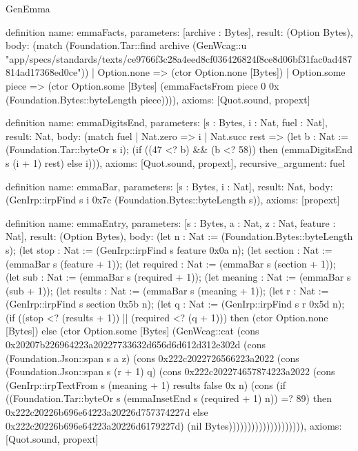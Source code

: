 \begin{lexlean}{GenEmma}
\begin{semanticmodule}
definition{
  name: emmaFacts,
  parameters: [archive : Bytes],
  result: (Option Bytes),
  body: (match (Foundation.Tar::find archive (GenWcag::u "app/specs/standards/texts/ce9766f3c28a4eed8cf036426824f8ce8d06bf31fac0ad487814ad17368ed0ce"))
    | Option.none => (ctor Option.none [Bytes])
    | Option.some piece => (ctor Option.some [Bytes] (emmaFactsFrom piece 0 0x (Foundation.Bytes::byteLength piece)))),
  axioms: [Quot.sound, propext]
}

definition{
  name: emmaDigitsEnd,
  parameters: [s : Bytes, i : Nat, fuel : Nat],
  result: Nat,
  body: (match fuel
    | Nat.zero => i
    | Nat.succ rest => (let b : Nat := (Foundation.Tar::byteOr s i); (if ((47 <? b) && (b <? 58)) then (emmaDigitsEnd s (i + 1) rest) else i))),
  axioms: [Quot.sound, propext],
  recursive_argument: fuel
}

definition{
  name: emmaBar,
  parameters: [s : Bytes, i : Nat],
  result: Nat,
  body: (GenIrp::irpFind s i 0x7c (Foundation.Bytes::byteLength s)),
  axioms: [propext]
}

definition{
  name: emmaEntry,
  parameters: [s : Bytes, a : Nat, z : Nat, feature : Nat],
  result: (Option Bytes),
  body: (let n : Nat := (Foundation.Bytes::byteLength s); (let stop : Nat := (GenIrp::irpFind s feature 0x0a n); (let section : Nat := (emmaBar s (feature + 1)); (let required : Nat := (emmaBar s (section + 1)); (let sub : Nat := (emmaBar s (required + 1)); (let meaning : Nat := (emmaBar s (sub + 1)); (let results : Nat := (emmaBar s (meaning + 1)); (let r : Nat := (GenIrp::irpFind s section 0x5b n); (let q : Nat := (GenIrp::irpFind s r 0x5d n); (if ((stop <? (results + 1)) || (required <? (q + 1))) then (ctor Option.none [Bytes]) else (ctor Option.some [Bytes] (GenWcag::cat (cons 0x20207b226964223a20227733632d656d6d612d312e302d (cons (Foundation.Json::span s a z) (cons 0x222c2022726566223a2022 (cons (Foundation.Json::span s (r + 1) q) (cons 0x222c202274657874223a2022 (cons (GenIrp::irpTextFrom s (meaning + 1) results false 0x n) (cons (if ((Foundation.Tar::byteOr s (emmaInsetEnd s (required + 1) n)) =? 89) then 0x222c20226b696e64223a20226d757374227d else 0x222c20226b696e64223a20226d6179227d) (nil Bytes)))))))))))))))))))),
  axioms: [Quot.sound, propext]
}


\end{semanticmodule}
\end{lexlean}
